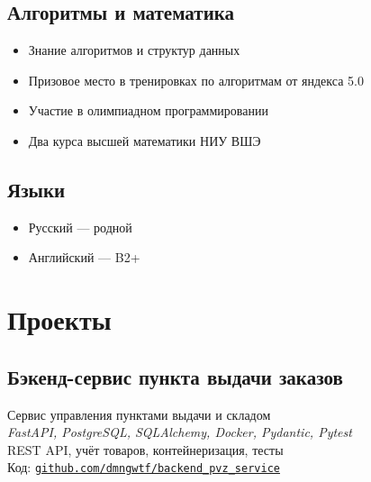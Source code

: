 \documentclass[a4paper,12pt]{article}
\begin{document}
	\subsection*{Алгоритмы и математика}
	\begin{itemize}[leftmargin=1.5em]
		\item Знание алгоритмов и структур данных
		\item Призовое место в тренировках по алгоритмам от яндекса 5.0
		\item Участие в олимпиадном программировании
		\item Два курса высшей математики НИУ ВШЭ
		
	\end{itemize}
	
	\subsection*{Языки}
	\begin{itemize}[leftmargin=1.5em]
		\item Русский — родной
		\item Английский — B2+
	\end{itemize}
	
	\vspace{10pt}
	
	
	
	
	\section*{Проекты}
	
	\subsection*{Бэкенд-сервис пункта выдачи заказов}
	Сервис управления пунктами выдачи и складом \\
	\textit{FastAPI, PostgreSQL, SQLAlchemy, Docker, Pydantic, Pytest}\\  
	REST API, учёт товаров, контейнеризация, тесты\\
	{Код: \href{https://github.com/dmngwtf/backend_pvz_service}{\texttt{github.com/dmngwtf/backend\_pvz\_service}}}

		
		
	
\end{document}
